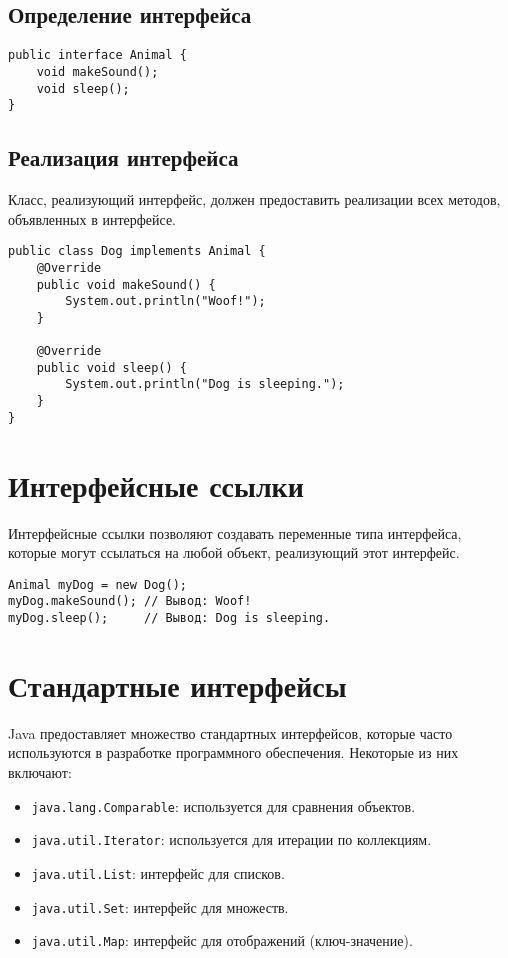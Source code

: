 \documentclass[12pt, a4paper]{article}
\begin{document}
\subsection*{Определение интерфейса}
\begin{verbatim}
public interface Animal {
    void makeSound();
    void sleep();
}
\end{verbatim}

\subsection*{Реализация интерфейса}
Класс, реализующий интерфейс, должен предоставить реализации всех методов, объявленных в интерфейсе.

\begin{verbatim}
public class Dog implements Animal {
    @Override
    public void makeSound() {
        System.out.println("Woof!");
    }

    @Override
    public void sleep() {
        System.out.println("Dog is sleeping.");
    }
}
\end{verbatim}

\section*{Интерфейсные ссылки}
Интерфейсные ссылки позволяют создавать переменные типа интерфейса, которые могут ссылаться на любой объект, реализующий этот интерфейс.

\begin{verbatim}
Animal myDog = new Dog();
myDog.makeSound(); // Вывод: Woof!
myDog.sleep();     // Вывод: Dog is sleeping.
\end{verbatim}

\section*{Стандартные интерфейсы}

Java предоставляет множество стандартных интерфейсов, которые часто используются в разработке программного обеспечения. Некоторые из них включают:
\begin{itemize}
    \item \texttt{java.lang.Comparable}: используется для сравнения объектов.
    \item \texttt{java.util.Iterator}: используется для итерации по коллекциям.
    \item \texttt{java.util.List}: интерфейс для списков.
    \item \texttt{java.util.Set}: интерфейс для множеств.
    \item \texttt{java.util.Map}: интерфейс для отображений (ключ-значение).
\end{itemize}
\end{document}
